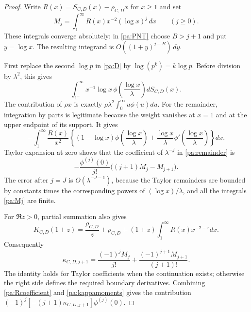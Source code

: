 \documentclass[11pt,reqno]{amsart}
\numberwithin{equation}{section}
\theoremstyle{definition}
\theoremstyle{remark}
\begin{document}
\begin{proof}
Write $R(x)=S_{C,D}(x)-\rho_{C,D}x$ for $x\ge1$ and set
\begin{equation}M_j=\int_1^\infty R(x)x^{-2}(\log x)^j\,dx\qquad(j\ge0).\label{pa:Mj}\end{equation}
These integrals converge absolutely: in \eqref{pa:PNT} choose $B>j+1$ and put $y=\log x$. The resulting integrand is $O((1+y)^{j-B})\,dy$.

First replace the second $\log p$ in \eqref{pa:D} by $\log(p^k)=k\log p$. Before division by $\lambda^2$, this gives
\begin{equation}\int_{1^-}^\infty x^{-1}\log x\,
\phi\left(\frac{\log x}{\lambda}\right)dS_{C,D}(x).\label{pa:Stieltjes}\end{equation}
The contribution of $\rho x$ is exactly $\rho\lambda^2\int_0^\infty u\phi(u)du$. For the remainder, integration by parts is legitimate because the weight vanishes at $x=1$ and at the upper endpoint of its support. It gives
\begin{equation}-\int_1^\infty\frac{R(x)}{x^2}
\left\{(1-\log x)\phi\left(\frac{\log x}{\lambda}\right)
+\frac{\log x}{\lambda}\phi'\left(\frac{\log x}{\lambda}\right)\right\}dx.\label{pa:remainder}\end{equation}
Taylor expansion at zero shows that the coefficient of $\lambda^{-j}$ in \eqref{pa:remainder} is
\begin{equation}-\frac{\phi^{(j)}(0)}{j!}\bigl((j+1)M_j-M_{j+1}\bigr).\label{pa:Rcoefficient}\end{equation}
The error after $j=J$ is $O(\lambda^{-J-1})$, because the Taylor remainders are bounded by constants times the corresponding powers of $(\log x)/\lambda$, and all the integrals \eqref{pa:Mj} are finite.

For $\Re z>0$, partial summation also gives
\begin{equation}K_{C,D}(1+z)=\frac{\rho_{C,D}}z+\rho_{C,D}
+(1+z)\int_1^\infty R(x)x^{-2-z}dx.\label{pa:Kmoments}\end{equation}
Consequently
\begin{equation}\kappa_{C,D,j+1}
=\frac{(-1)^jM_j}{j!}+\frac{(-1)^{j+1}M_{j+1}}{(j+1)!}.
\label{pa:kappamoments}\end{equation}
The identity holds for Taylor coefficients when the continuation exists; otherwise the right side defines the required boundary derivatives. Combining \eqref{pa:Rcoefficient} and \eqref{pa:kappamoments} gives the contribution $(-1)^j[-(j+1)\kappa_{C,D,j+1}]\phi^{(j)}(0)$.


\end{proof}
\end{document}
